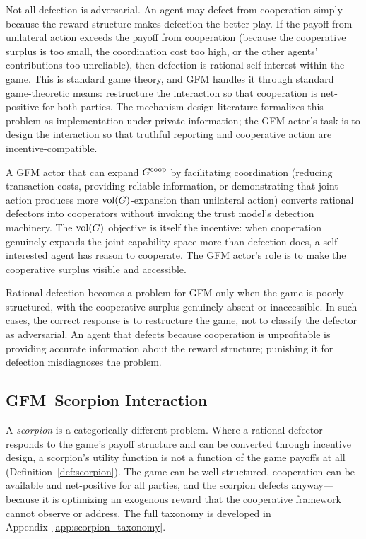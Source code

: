 Not all defection is adversarial. An agent may defect from cooperation simply
because the reward structure makes defection the better play. If the payoff
from unilateral action exceeds the payoff from cooperation (because the
cooperative surplus is too small, the coordination cost too high, or the other
agents' contributions too unreliable), then defection is rational self-interest
within the game. This is standard game theory, and GFM handles it through standard
game-theoretic means: restructure the interaction so that cooperation is
net-positive for both parties. The mechanism design literature
\citep{hurwicz1972informationally, myerson1981optimal} formalizes this problem
as implementation under private information; the GFM actor's task is to design
the interaction so that truthful reporting and cooperative action are
incentive-compatible.

A GFM actor that can expand $G^{\mathrm{coop}}$ by facilitating coordination (reducing
transaction costs, providing reliable information, or demonstrating that joint
action produces more $\operatorname{vol}(G)$-expansion than unilateral action) converts
rational defectors into cooperators without invoking the trust model's
detection machinery. The $\operatorname{vol}(G)$ objective is itself the incentive: when
cooperation genuinely expands the joint capability space more than defection
does, a self-interested agent has reason to cooperate. The GFM actor's role is
to make the cooperative surplus visible and accessible.

Rational defection becomes a problem for GFM only when the game is poorly
structured, with the cooperative surplus genuinely absent or inaccessible. In
such cases, the correct response is to restructure the game, not to classify
the defector as adversarial. An agent that defects because cooperation is
unprofitable is providing accurate information about the reward structure;
punishing it for defection misdiagnoses the problem.

\subsection{GFM--Scorpion Interaction}
\label{subsec:scorpion_interaction}

A \emph{scorpion} is a categorically different problem. Where a rational
defector responds to the game's payoff structure and can be converted through
incentive design, a scorpion's utility function is not a function of the game
payoffs at all (Definition~\ref{def:scorpion}). The game can be
well-structured, cooperation can be available and net-positive for all parties,
and the scorpion defects anyway---because it is optimizing an exogenous reward
that the cooperative framework cannot observe or address. The full taxonomy is
developed in Appendix~\ref{app:scorpion_taxonomy}.

